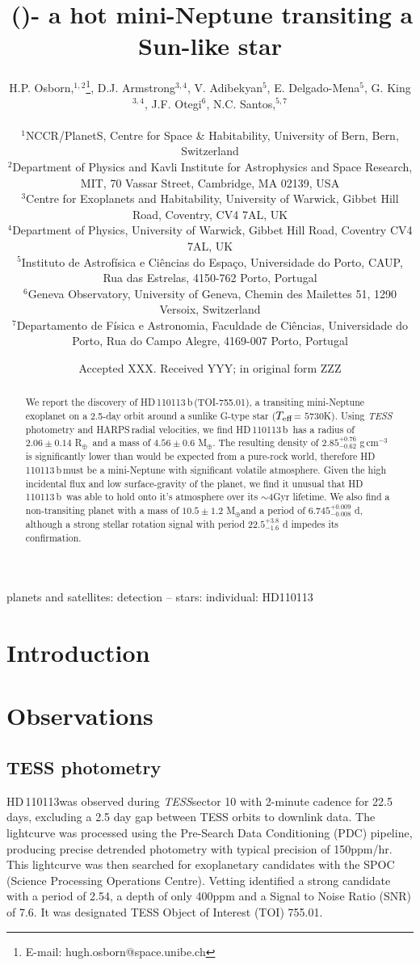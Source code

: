 \documentclass[fleqn,usenatbib]{mnras}
\title[\Tplanet]{\Tplanet\,(\TTplanet)- a hot mini-Neptune transiting a Sun-like star}
\author[H.P. Osborn et al.]{
\parbox{\textwidth}{H.P. Osborn,$^{{1},{2}}$\thanks{E-mail: hugh.osborn@space.unibe.ch},
D.J. Armstrong$^{3,4}$, %
V. Adibekyan$^{5}$, %
E. Delgado-Mena$^{5}$,
G. King$^{3,4}$, %
J.F. Otegi$^{6}$, %
N.C. Santos,$^{5,7}$ %
 }\\
$^{1}$NCCR/PlanetS, Centre for Space \& Habitability, University of Bern, Bern, Switzerland\\
$^{2}$Department of Physics and Kavli Institute for Astrophysics and Space Research, MIT, 70 Vassar Street, Cambridge, MA 02139, USA\\
$^{3}$Centre for Exoplanets and Habitability, University of Warwick, Gibbet Hill Road, Coventry, CV4 7AL, UK\\
$^{4}$Department of Physics, University of Warwick, Gibbet Hill Road, Coventry CV4 7AL, UK \\
$^{5}$Instituto de Astrof\'isica e Ci\^encias do Espa\c{c}o, Universidade do Porto, CAUP, Rua das Estrelas, 4150-762 Porto, Portugal\\
$^{6}$Geneva Observatory, University of Geneva, Chemin des Mailettes 51, 1290 Versoix, Switzerland\\
$^{7}$Departamento de F\'isica e Astronomia, Faculdade de Ci\^{e}ncias, Universidade do Porto, Rua do Campo Alegre, 4169-007 Porto, Portugal\\
}
\date{Accepted XXX. Received YYY; in original form ZZZ}
\newcommand{\gcm}{g\,cm$^{-3}$}	%
\newcommand{\tess}{{\it TESS}}
\newcommand{\harps}{{HARPS}}
\newcommand{\rearth}{R$_{\oplus}$}
\newcommand{\mearth}{M$_{\oplus}$}
\newcommand{\teff}{$T_{\rm eff}$}
\newcommand{\TPone}{ $ 6.745^{+0.009}_{-0.008} $ }
\newcommand{\TMpzero}{ $ 4.56 \pm 0.6 $ }
\newcommand{\TMpone}{ $ 10.5 \pm 1.2 $ }
\newcommand{\Trplzero}{ $ 2.06 \pm 0.14 $ }
\newcommand{\Trhopgcmthreezero}{ $ 2.85^{+0.76}_{-0.62} $ }
\newcommand{\Tperiod}{ $ 22.5^{+3.8}_{-1.6} $ }
\newcommand{\TTplanet}{TOI-755.01}
\newcommand{\Tstar}{HD\,110113}
\newcommand{\Tplanet}{HD\,110113\,b}
\begin{document}
\label{firstpage}
\pagerange{\pageref{firstpage}--\pageref{lastpage}}
\maketitle

\begin{abstract}
We report the discovery of \Tplanet\,(\TTplanet), a transiting mini-Neptune exoplanet on a 2.5-day orbit around a sunlike G-type star (\teff= $5730$K).  
Using \tess\,photometry and \harps\,radial velocities, we find \Tplanet\, has a radius of \Trplzero \rearth\, and a mass of \TMpzero \mearth.
The resulting density of \Trhopgcmthreezero\gcm\,is significantly lower than would be expected from a pure-rock world, therefore \Tplanet\,must be a mini-Neptune with significant volatile atmosphere.
Given the high incidental flux and low surface-gravity of the planet, we find it unusual that \Tplanet\, was able to hold onto it's atmosphere over its $\sim4$Gyr lifetime.
We also find a non-transiting planet with a mass of \TMpone \mearth and a period of \TPone d, although a strong stellar rotation signal with period \Tperiod d impedes its confirmation.
\end{abstract}

\begin{keywords}
planets and satellites: detection -- stars: individual: HD110113
\end{keywords}



\section{Introduction}


\section{Observations}

\subsection{TESS photometry}
\Tstar was observed during \tess sector 10 with 2-minute cadence for 22.5 days, excluding a 2.5 day gap between TESS orbits to downlink data.
The lightcurve was processed using the Pre-Search Data Conditioning (PDC) pipeline, producing precise detrended photometry with typical precision of 150ppm/hr.
This lightcurve was then searched for exoplanetary candidates with the SPOC (Science Processing Operations Centre).
Vetting identified a strong candidate with a period of 2.54, a depth of only 400ppm and a Signal to Noise Ratio (SNR) of 7.6.
It was designated TESS Object of Interest (TOI) 755.01. 
\end{document}
